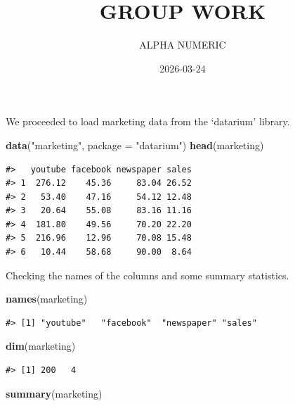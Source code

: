\documentclass[
  10pt,
]{article}
\title{GROUP WORK}
\author{ALPHA NUMERIC}
\date{2026-03-24}
\newenvironment{Shaded}{\begin{snugshade}}{\end{snugshade}}
\newcommand{\AttributeTok}[1]{\textcolor[rgb]{0.13,0.29,0.53}{#1}}
\newcommand{\FunctionTok}[1]{\textcolor[rgb]{0.13,0.29,0.53}{\textbf{#1}}}
\newcommand{\NormalTok}[1]{#1}
\newcommand{\StringTok}[1]{\textcolor[rgb]{0.31,0.60,0.02}{#1}}
\begin{document}
\maketitle

We proceeded to load marketing data from the `datarium' library.\\

\begin{Shaded}
\begin{Highlighting}[]
\FunctionTok{data}\NormalTok{(}\StringTok{"marketing"}\NormalTok{, }\AttributeTok{package =} \StringTok{"datarium"}\NormalTok{)}
\FunctionTok{head}\NormalTok{(marketing)}
\end{Highlighting}
\end{Shaded}

\begin{verbatim}
#>   youtube facebook newspaper sales
#> 1  276.12    45.36     83.04 26.52
#> 2   53.40    47.16     54.12 12.48
#> 3   20.64    55.08     83.16 11.16
#> 4  181.80    49.56     70.20 22.20
#> 5  216.96    12.96     70.08 15.48
#> 6   10.44    58.68     90.00  8.64
\end{verbatim}

Checking the names of the columns and some summary statistics.\\

\begin{Shaded}
\begin{Highlighting}[]
\FunctionTok{names}\NormalTok{(marketing)}
\end{Highlighting}
\end{Shaded}

\begin{verbatim}
#> [1] "youtube"   "facebook"  "newspaper" "sales"
\end{verbatim}

\begin{Shaded}
\begin{Highlighting}[]
\FunctionTok{dim}\NormalTok{(marketing)}
\end{Highlighting}
\end{Shaded}

\begin{verbatim}
#> [1] 200   4
\end{verbatim}

\begin{Shaded}
\begin{Highlighting}[]
\FunctionTok{summary}\NormalTok{(marketing)}
\end{Highlighting}
\end{Shaded}
\end{document}
